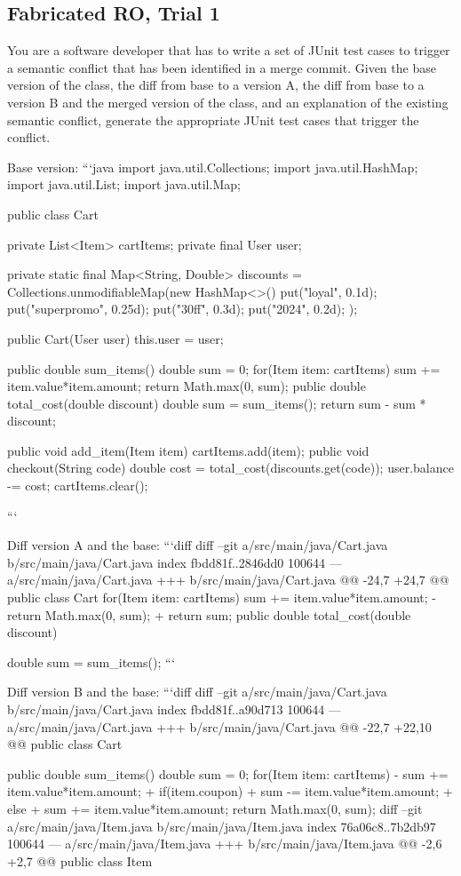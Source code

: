 \subsection{Fabricated RO, Trial 1}

\begin{prompt}
You are a software developer that has to write a set of JUnit test cases to trigger a semantic conflict that has been identified in a merge commit. 
Given the base version of the class, the diff from base to a version A, the diff from base to a version B and the merged version of the class, and an explanation of the existing semantic conflict, generate the appropriate JUnit test cases that trigger the conflict.

Base version:
```java
import java.util.Collections;
import java.util.HashMap;
import java.util.List;
import java.util.Map;

public class Cart {
    private List<Item> cartItems;
    private final User user;

    private static final Map<String, Double> discounts = Collections.unmodifiableMap(new HashMap<>() {{
        put("loyal", 0.1d);
        put("superpromo", 0.25d);
        put("30ff", 0.3d);
        put("2024", 0.2d);
    }});


    public Cart(User user) {
        this.user = user;
    }

    public double sum_items() {
        double sum = 0;
        for(Item item: cartItems) {
            sum += item.value*item.amount;
        }
        return Math.max(0, sum);
    }
    public double total_cost(double discount) {
        double sum = sum_items();
        return sum - sum * discount;
    }

    public void add_item(Item item) {
        cartItems.add(item);
    }
    public void checkout(String code) {
        double cost = total_cost(discounts.get(code));
        user.balance -= cost;
        cartItems.clear();
    }
}
```

Diff version A and the base:
```diff
diff --git a/src/main/java/Cart.java b/src/main/java/Cart.java
index fbdd81f..2846dd0 100644
--- a/src/main/java/Cart.java
+++ b/src/main/java/Cart.java
@@ -24,7 +24,7 @@ public class Cart {
          for(Item item: cartItems) {
              sum += item.value*item.amount;
          }
-        return Math.max(0, sum);
+        return sum;
      }
      public double total_cost(double discount) {
          double sum = sum_items();
```

Diff version B and the base:
```diff
diff --git a/src/main/java/Cart.java b/src/main/java/Cart.java
index fbdd81f..a90d713 100644
--- a/src/main/java/Cart.java
+++ b/src/main/java/Cart.java
@@ -22,7 +22,10 @@ public class Cart {
      public double sum_items() {
          double sum = 0;
          for(Item item: cartItems) {
-            sum += item.value*item.amount;
+            if(item.coupon)
+                sum -= item.value*item.amount;
+            else
+                sum += item.value*item.amount;
          }
          return Math.max(0, sum);
      }
diff --git a/src/main/java/Item.java b/src/main/java/Item.java
index 76a06c8..7b2db97 100644
--- a/src/main/java/Item.java
+++ b/src/main/java/Item.java
@@ -2,6 +2,7 @@ public class Item {

}}}
\end{prompt}
